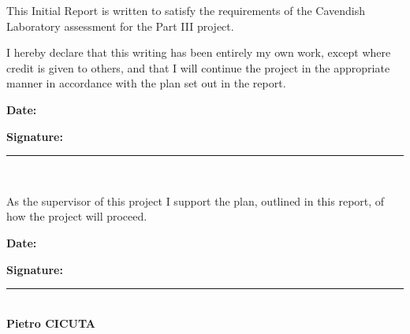 \declaration \label{declaration} %
\vspace{-5mm}


This Initial Report is written to satisfy the requirements of the Cavendish Laboratory assessment for the Part III project.

I hereby declare that this writing has been entirely my own work, except where credit is given to others, and that I will continue the project in the appropriate manner in accordance with the plan set out in the report.

\noindent \textbf{Date: \Exactdate}  \hfill{\textbf{Signature:} \rule{59mm}{0.5pt}} \\%
\hspace*{8.5cm} \textbf{\Author} 

As the supervisor of this project I support the plan, outlined in this report, of how the project will proceed.

\noindent \textbf{Date: }  \hfill{\textbf{Signature:} \rule{59mm}{0.5pt}} \\
\hspace*{8.5cm} \textbf{Pietro CICUTA} \\



